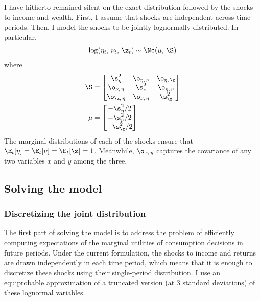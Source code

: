 I have hitherto remained silent on the exact distribution followed by the shocks to income and wealth. First, I assume that shocks are independent across time periods. Then, I model the shocks to be jointly lognormally distributed. In particular,
\begin{align*}
    \log (\eta_t,\,\nu_t,\,\z_t) \sim \Nc(\mu,\,\S)
\end{align*}
where
\begin{align*}
    \S &= \begin{bmatrix}
        \s_{\eta}^2 & \o_{\eta,\,\nu} & \o_{\eta,\,\z}\\
        \o_{\nu,\,\eta} & \s_{\nu}^2 & \o_{\eta,\,\nu}\\
        \o_{\z,\,\eta} & \o_{\nu,\,\eta} & \s_{\z}^2
    \end{bmatrix}\\
    \mu &= \begin{bmatrix}
        -\s_{\eta}^2 / 2\\
        -\s_{\nu}^2 / 2\\
        -\s_{\z}^2 / 2
    \end{bmatrix}
\end{align*}
The marginal distributions of each of the shocks ensure that $\E_t[\eta] = \E_t[\nu] = \E_t[\z] = 1$. Meanwhile, $\o_{x,\,y}$ captures the covariance of any two variables $x$ and $y$ among the three.

\subsection{Solving the model}

\subsubsection{Discretizing the joint distribution}\label{discretization}

The first part of solving the model is to address the problem of efficiently computing expectations of the marginal utilities of consumption decisions in future periods. Under the current formulation, the shocks to income and returns are drawn independently in each time period, which means that it is enough to discretize these shocks using their single-period distribution. I use an equiprobable approximation of a truncated version (at 3 standard deviations) of these lognormal variables.


